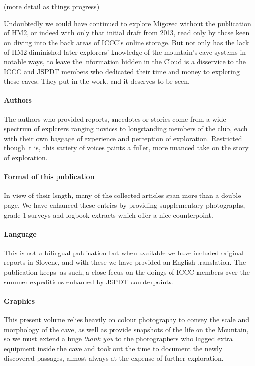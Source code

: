 \begin{tcolorbox}
\begin{fullwidth}
\begin{multicols}{2}
            (more detail as things progress)

            Undoubtedly we could have continued to explore Migovec without the publication of HM2, or indeed with only that initial draft from 2013, read only by those keen on diving into the back areas of ICCC's online storage. But not only has the lack of HM2 diminished later explorers' knowledge of the mountain's cave systems in notable ways, to leave the information hidden in the Cloud is a disservice to the ICCC and JSPDT members who dedicated their time and money to exploring these caves. They put in the work, and it deserves to be seen.


            \paragraph{Authors}

 			The authors who provided reports, anecdotes or stories come from a wide spectrum of explorers ranging novices to longstanding members of the club, each with their own baggage of experience and perception of exploration. Restricted though it is, this variety of voices paints a fuller, more nuanced take on the story of exploration.


 			\paragraph{Format of this publication}

 			In view of their length, many of the collected articles span more than a double page. We have enhanced these entries by providing supplementary photographs, grade 1 surveys and logbook extracts which offer a nice counterpoint.


 			\paragraph{Language}

 			This is not a bilingual publication but when available we have included original reports in Slovene, and with these we have provided an English translation. The publication keeps, as such, a close focus on the doings of ICCC members over the summer expeditions enhanced by JSPDT counterpoints. 


 			\paragraph{Graphics}

 			This present volume relies heavily on colour photography to convey the scale and morphology of the cave, as well as provide snapshots of the life on the Mountain, so we must extend a huge \textit{thank you} to the photographers who lugged extra equipment inside the cave and took out the time to document the newly discovered passages, almost always at the expense of further exploration. 


\end{multicols}
\end{fullwidth}
\end{tcolorbox}
